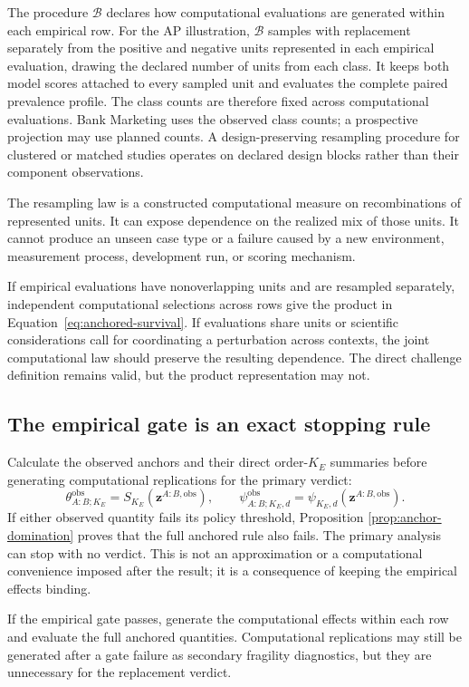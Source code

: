 \documentclass[11pt]{article}
\newcommand{\Boot}{\mathcal{B}}
\theoremstyle{remark}
\begin{document}
The procedure $\Boot$ declares how computational evaluations are generated
within each empirical row. For the AP illustration, $\Boot$ samples with
replacement separately from the positive and negative units represented in
each empirical evaluation, drawing the declared number of units from each
class. It keeps both model scores attached to every sampled unit and evaluates
the complete paired prevalence profile. The class counts are therefore fixed
across computational evaluations. Bank Marketing uses the observed class
counts; a prospective projection may use planned counts. A design-preserving
resampling procedure for clustered or matched studies operates on declared
design blocks rather than their component observations.

The resampling law is a constructed computational measure on recombinations of
represented units. It can expose dependence on the realized mix of those
units. It cannot produce an unseen case type or a failure caused by a new
environment, measurement process, development run, or scoring mechanism.

If empirical evaluations have nonoverlapping units and are resampled
separately, independent computational selections across rows give the product
in Equation~\eqref{eq:anchored-survival}. If evaluations share units or
scientific considerations call for coordinating a perturbation across
contexts, the joint computational law should preserve the resulting
dependence. The direct challenge definition remains valid, but the product
representation may not.

\subsection{The empirical gate is an exact stopping rule}

Calculate the observed anchors and their direct order-$K_E$ summaries before
generating computational replications for the primary verdict:
\[
\theta^{\mathrm{obs}}_{A:B;K_E}
=S_{K_E}(\mathbf z^{A:B,\mathrm{obs}}),
\qquad
\psi^{\mathrm{obs}}_{A:B;K_E,d}
=\psi_{K_E,d}(\mathbf z^{A:B,\mathrm{obs}}).
\]
If either observed quantity fails its policy threshold, Proposition
\ref{prop:anchor-domination} proves that the full anchored rule also fails.
The primary analysis can stop with no verdict. This is not an approximation or
a computational convenience imposed after the result; it is a consequence of
keeping the empirical effects binding.

If the empirical gate passes, generate the computational effects within each
row and evaluate the full anchored quantities. Computational replications may
still be generated after a gate failure as secondary fragility diagnostics,
but they are unnecessary for the replacement verdict.
\end{document}
